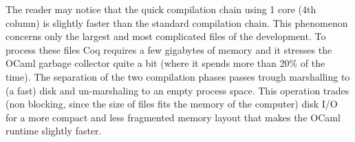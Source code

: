 \documentclass[runningheads,a4paper,oribibl]{llncs}
\newcommand{\tmverbatim}[1]{\lstinline|#1|}
\begin{document}
 The reader may notice that the quick compilation chain using 1 core (4th
 column) is slightly faster than the standard compilation chain. 
 This phenomenon concerns only the
 largest and most complicated files of the development.
 To process these files Coq requires a few gigabytes of
 memory and it stresses the OCaml garbage collector quite a bit (where it spends
 more than 20\% of the time). The separation of the two compilation phases
 passes trough marshalling
 to (a fast) disk and un-marshaling to an empty process space. This operation
 trades (non blocking, since the size of files fits the memory of the computer)
 disk I/O for a more compact and less fragmented memory layout that makes the
 OCaml runtime slightly faster.


% 
%   
%   
% 
% 
% 
% 
%   
%   
\end{document}
